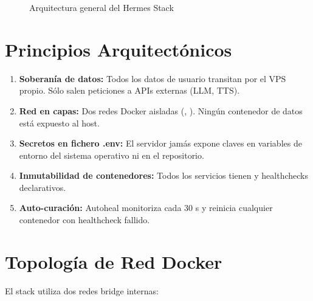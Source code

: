 \begin{figure}[h]
\caption{Arquitectura general del Hermes Stack}
\end{figure}

\section{Principios Arquitectónicos}

\begin{enumerate}[label=\textbf{\arabic*.}]
  \item \textbf{Soberanía de datos:} Todos los datos de usuario transitan
    por el VPS propio. Sólo salen peticiones a APIs externas (LLM, TTS).

  \item \textbf{Red en capas:} Dos redes Docker aisladas (,
    ). Ningún contenedor de datos está expuesto al host.

  \item \textbf{Secretos en fichero .env:} El servidor jamás expone claves
    en variables de entorno del sistema operativo ni en el repositorio.

  \item \textbf{Inmutabilidad de contenedores:} Todos los servicios tienen
     y healthchecks declarativos.

  \item \textbf{Auto-curación:} Autoheal monitoriza cada 30 s y reinicia
    cualquier contenedor con healthcheck fallido.
\end{enumerate}

\section{Topología de Red Docker}

El stack utiliza dos redes bridge internas:

